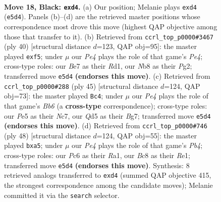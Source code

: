 \documentclass[11pt]{article}
\begin{document}
\begin{figure}[p]\centering
\begin{subfigure}{0.46\textwidth}\centering
\resizebox{\linewidth}{!}{%
\newchessgame
\chessboard[
  setfen={rnb1r1k1/p3b2p/2p2pp1/1p1qp3/3P3P/1P1Q1PP1/P2NP1K1/RNB2R2 b - - 0 18},
  showmover=false,
  pgfstyle=straightmove, color=movearrow, markmove={e5-d4}
]}
\caption{}
\end{subfigure}\hfill
\begin{subfigure}{0.46\textwidth}\centering
\resizebox{\linewidth}{!}{%
\newchessgame
\chessboard[
  setfen={1r2r1k1/3nn1p1/p2pq2p/1pp1pp2/4P1Q1/2PPB2P/PP1N1PP1/3RR1K1 w - - 0 21},
  showmover=false,
  pgfstyle=straightmove, color=movearrow, markmove={e4-f5}
]}
\caption{}
\end{subfigure}
\\[4pt]
\begin{subfigure}{0.46\textwidth}\centering
\resizebox{\linewidth}{!}{%
\newchessgame
\chessboard[
  setfen={3qr1k1/2n1ppb1/1r4pp/1p1P4/p2P1N1P/PbN1Q1P1/1P2RPB1/R5K1 b - - 2 23},
  showmover=false,
  pgfstyle=straightmove, color=movearrow, markmove={b3-c4}
]}
\caption{}
\end{subfigure}\hfill
\begin{subfigure}{0.46\textwidth}\centering
\resizebox{\linewidth}{!}{%
\newchessgame
\chessboard[
  setfen={r4r2/2pqn1pk/5bnp/pp2pp1Q/PP6/2PP2PP/2B2P2/R1B1RNK1 w - - 0 25},
  showmover=false,
  pgfstyle=straightmove, color=movearrow, markmove={b4-a5}
]}
\caption{}
\end{subfigure}
\caption{\textbf{Move 18, Black: \texttt{exd4}.} (a) Our position; Melanie plays \texttt{exd4} (\texttt{e5d4}). Panels (b)--(d) are the retrieved master positions whose correspondence most drove this move (highest QAP objective among those that transfer to it). (b) Retrieved from \texttt{ccrl\_top\_p0000\#3467} (ply 40) [structural distance $d$=123, QAP obj=95]: the master played \texttt{exf5}; under $\mu$ our \emph{Pe4} plays the role of that game's \emph{Pe4}; cross-type roles: our \emph{B}e7 as their \emph{R}d1, our \emph{N}b8 as their \emph{P}g2; transferred move \texttt{e5d4} \textbf{(endorses this move)}. (c) Retrieved from \texttt{ccrl\_top\_p0000\#288} (ply 45) [structural distance $d$=124, QAP obj=73]: the master played \texttt{Bc4}; under $\mu$ our \emph{Pe4} plays the role of that game's \emph{Bb6} (a \textbf{cross-type} correspondence); cross-type roles: our \emph{P}e5 as their \emph{N}c7, our \emph{Q}d5 as their \emph{B}g7; transferred move \texttt{e5d4} \textbf{(endorses this move)}. (d) Retrieved from \texttt{ccrl\_top\_p0000\#746} (ply 48) [structural distance $d$=124, QAP obj=55]: the master played \texttt{bxa5}; under $\mu$ our \emph{Pe4} plays the role of that game's \emph{Pb4}; cross-type roles: our \emph{P}c6 as their \emph{R}a1, our \emph{B}c8 as their \emph{R}e1; transferred move \texttt{e5d4} \textbf{(endorses this move)}. Synthesis: 8 retrieved analogs transferred to \texttt{exd4} (summed QAP objective 415, the strongest correspondence among the candidate moves); Melanie committed it via the \texttt{search} selector.}
\label{fig:thought-m35}
\end{figure}
\end{document}
